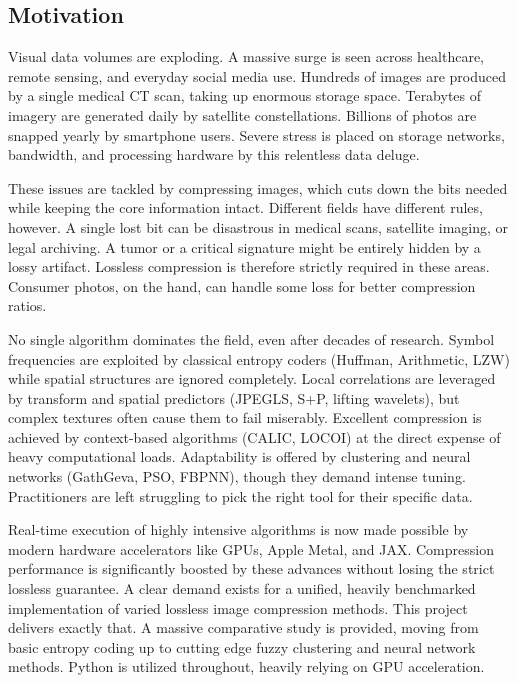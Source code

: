 

\subsection{Motivation}

Visual data volumes are exploding. A massive surge is seen across healthcare, remote sensing, and everyday social media use. Hundreds of images are produced by a single medical CT scan, taking up enormous storage space. Terabytes of imagery are generated daily by satellite constellations. Billions of photos are snapped yearly by smartphone users. Severe stress is placed on storage networks, bandwidth, and processing hardware by this relentless data deluge.

These issues are tackled by compressing images, which cuts down the bits needed while keeping the core information intact. Different fields have different rules, however. A single lost bit can be disastrous in medical scans, satellite imaging, or legal archiving. A tumor or a critical signature might be entirely hidden by a lossy artifact. Lossless compression is therefore strictly required in these areas. Consumer photos, on the hand, can handle some loss for better compression ratios.

No single algorithm dominates the field, even after decades of research. Symbol frequencies are exploited by classical entropy coders (Huffman, Arithmetic, LZW) while spatial structures are ignored completely. Local correlations are leveraged by transform and spatial predictors (JPEGLS, S+P, lifting wavelets), but complex textures often cause them to fail miserably. Excellent compression is achieved by context-based algorithms (CALIC, LOCOI) at the direct expense of heavy computational loads. Adaptability is offered by clustering and neural networks (GathGeva, PSO, FBPNN), though they demand intense tuning. Practitioners are left struggling to pick the right tool for their specific data.

Real-time execution of highly intensive algorithms is now made possible by modern hardware accelerators like GPUs, Apple Metal, and JAX. Compression performance is significantly boosted by these advances without losing the strict lossless guarantee. A clear demand exists for a unified, heavily benchmarked implementation of varied lossless image compression methods. This project delivers exactly that. A massive comparative study is provided, moving from basic entropy coding up to cutting edge fuzzy clustering and neural network methods. Python is utilized throughout, heavily relying on GPU acceleration.


